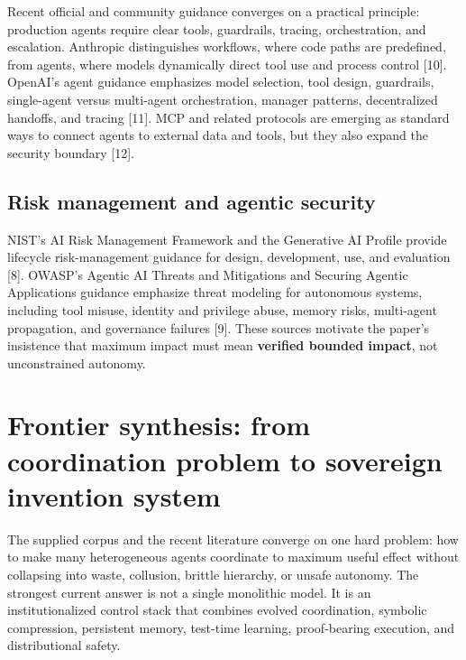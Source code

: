 Recent official and community guidance converges on a practical
principle: production agents require clear tools, guardrails, tracing,
orchestration, and escalation. Anthropic distinguishes workflows, where
code paths are predefined, from agents, where models dynamically direct
tool use and process control {[}10{]}. OpenAI's agent guidance
emphasizes model selection, tool design, guardrails, single-agent versus
multi-agent orchestration, manager patterns, decentralized handoffs, and
tracing {[}11{]}. MCP and related protocols are emerging as standard
ways to connect agents to external data and tools, but they also expand
the security boundary {[}12{]}.

\subsection{Risk management and agentic
security}\label{risk-management-and-agentic-security}

NIST's AI Risk Management Framework and the Generative AI Profile
provide lifecycle risk-management guidance for design, development, use,
and evaluation {[}8{]}. OWASP's Agentic AI Threats and Mitigations and
Securing Agentic Applications guidance emphasize threat modeling for
autonomous systems, including tool misuse, identity and privilege abuse,
memory risks, multi-agent propagation, and governance failures {[}9{]}.
These sources motivate the paper's insistence that maximum impact must
mean \textbf{verified bounded impact}, not unconstrained autonomy.

\section{Frontier synthesis: from coordination problem to sovereign
invention
system}\label{frontier-synthesis-from-coordination-problem-to-sovereign-invention-system}

The supplied corpus and the recent literature converge on one hard
problem: how to make many heterogeneous agents coordinate to maximum
useful effect without collapsing into waste, collusion, brittle
hierarchy, or unsafe autonomy. The strongest current answer is not a
single monolithic model. It is an institutionalized control stack that
combines evolved coordination, symbolic compression, persistent memory,
test-time learning, proof-bearing execution, and distributional safety.

